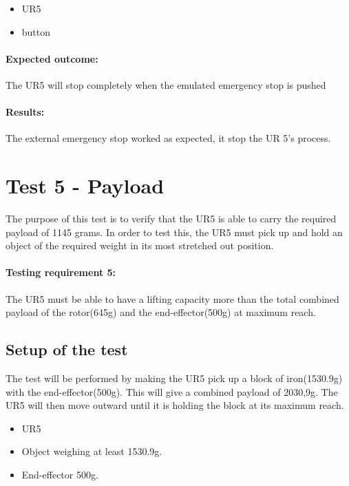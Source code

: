  \begin{itemize}
     \item UR5
     \item button
 \end{itemize}
 
 \paragraph{Expected outcome:}
The UR5 will stop completely when the emulated emergency stop is pushed

 
\paragraph{Results: }

The external emergency stop worked as expected, it stop the UR 5's process.


\section{Test 5 - Payload}
The purpose of this test is to verify that the UR5 is able to carry the required payload of 1145 grams. In order to test this, the UR5 must pick up and hold an object of the required weight in its most stretched out position.

\paragraph{Testing requirement 5:} The UR5 must be able to have a lifting capacity more than the total combined payload of the rotor(645g) and the end-effector(500g) at maximum reach.\\

\subsection{Setup of the test}
The test will be performed by making the UR5 pick up a block of iron(1530.9g) with the end-effector(500g). This will give a combined payload of 2030,9g. The UR5 will then move outward until it is holding the block at its maximum reach. 

 \begin{itemize}
     \item UR5
     \item Object weighing at least 1530.9g.
     \item End-effector 500g.
 \end{itemize}
 
